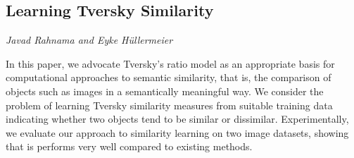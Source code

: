 \documentclass[../booklet.tex]{subfiles}
\begin{document}
\subsection[Learning Tversky Similarity. {\it Javad Rahnama and Eyke Hüllermeier}]{Learning Tversky Similarity}
 

\begin{center}
  {\it Javad Rahnama and Eyke Hüllermeier}
\end{center}

\vskip 0.8cm


In this paper, we advocate Tversky's ratio model as an appropriate basis for computational approaches to semantic similarity, that is, the comparison of objects such as images in a semantically meaningful way. We consider the problem of learning Tversky similarity measures from suitable training data indicating whether two objects tend to be similar or dissimilar. Experimentally, we evaluate our approach to similarity learning on two image datasets, showing that is performs very well compared to existing methods.

\end{document}
